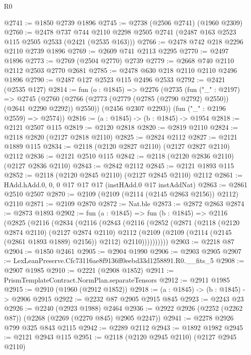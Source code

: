 \begin{lexlean}{R0}
\begin{coremodule}
@2741 := @1850 @2739 @1896
@2745 := @2738 (@2506 @2741) (@1960 @2309)
@2760 := @2478
    @737
    @744
    @2110
    @2298
    @2505
    @2741
    (@2487 @163 @2523 @115 @2505 @2533 (@2421 (@2535 @163)))
@2766 := @2478 @742 @218 @2296 @2110 @2739 @1896
@2769 := @2609 @741 @2113 @2295
@2770 := @2497 @1896
@2773 := @2769 (@2504 @2770) @2739
@2779 := @2668 @740 @2110 @2112 @2503 @2770 @2681
@2785 := @2478 @630 @218 @2110 @2110 @2496 @1896
@2790 := @2487 @127 @2523 @115 @2496 @2533
@2792 := @2421 (@2535 @127)
@2814 := fun (o : @1845) =>
  @2276
    (@2735
      (fun ("_" : @2197) =>
      @2745
        (@2760 (@2766 (@2773 (@2779 (@2785 (@2790 @2792) @2550)) (@2641 @2290 @2292)) @2550))
        (@2456 @2307 @2293))
      (fun ("_" : @2196 @2559) => @2574))
@2816 := (a : @1845) -> (b : @1845) -> @1954
@2818 := @2121 @2507 @115
@2819 := @2120 @2818
@2820 := @2819 @2110
@2824 := @2118 @2820 (@2127 @2818 @2110)
@2825 := @2824 @2112
@2827 := @2121 @1889 @115
@2834 := @2118 (@2120 @2827 @2110) (@2127 @2827 @2110) @2112
@2836 := @2121 @2510 @115
@2842 := @2118 (@2120 @2836 @2110) (@2127 @2836 @2110)
@2843 := @2842 @2112
@2845 := @2121 @1893 @115
@2852 := @2118 (@2120 @2845 @2110) (@2127 @2845 @2110) @2112
@2861 := HAdd.hAdd.{0, 0, 0} @17 @17 @17 (instHAdd.{0} @17 instAddNat)
@2863 := @2861 @2510 @2507
@2870 := @2109 (@2109 (@2114 (@2145 @2863 @2156)) @2112) @2110
@2871 := @2109 @2870
@2872 := Nat.ble
@2873 := @2872 @2863
@2874 := @2873 @1893
@2902 := fun (a : @1845) =>
  fun (b : @1845) =>
  @2116
    (@2825
      (@2116
        (@2834
          (@2116
            (@2843
              (@2116
                (@2852
                  (@2871
                    (@2118
                      (@2120 @2874 @2110)
                      (@2127 @2874 @2110)
                      @2112
                      (@2109 (@2109 (@2114 (@2145 (@2861 @1893 @1889) @2156)) @2112) @2110))))))))))
@2903 := @2218 @87
@2904 := @1850 @2461
@2905 := @2904 @1990
@2906 := @2903 @2905
@2907 := LexLeanPreserve.Cfc73116ae8f9136ff0eebd33d1258891.R0.__fits_5
@2908 := @2907 @1985
@2910 := @2221 (@2908 @1852)
@2911 := PrismTemplateContract.NormPlan.separateTensors
@2912 := @2911 @1985
@2915 := @2910 (@1960 (@2912 @1852))
@2918 := (a : @1845) -> (b : @1845) -> @2906 @2915
@2922 := @2232 @87 @2905 @2915 @845
@2923 := @2243 @23
@2926 := @2240 (@2923 @1988) @2464
@2936 := @2922 @2926 (@2252 (@2262 @87)) (@2268 (@2269 (@2270 @845) @2905 @2247))
@2941 := @2278 @2926 @799 @325 @843 @2115
@2942 := @2289 @2112
@2943 := @1892 @1982
@2945 := @2121 @2943 @115
@2951 := @2118 (@2120 @2945 @2110) (@2127 @2945 @2110)

\end{coremodule}
\end{lexlean}
